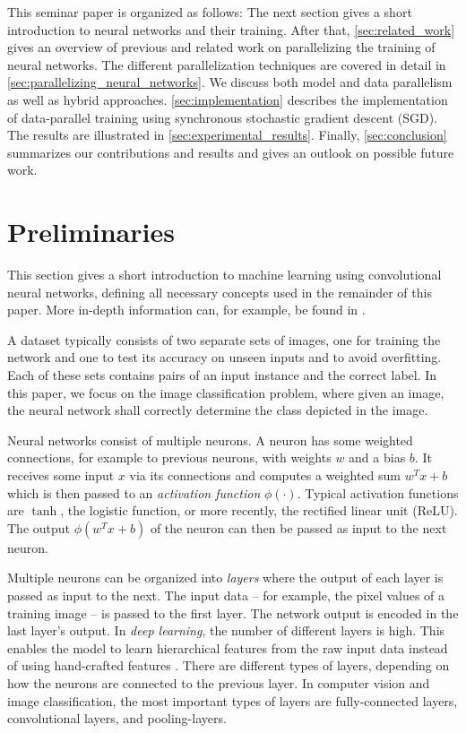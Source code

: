 \documentclass[conference,compsoc,a4paper]{IEEEtran}
\begin{document}
This seminar paper is organized as follows:
The next section gives a short introduction to neural networks and their training.
After that, \autoref{sec:related_work} gives an overview of previous and related work on parallelizing the training of neural networks.
The different parallelization techniques are covered in detail in \autoref{sec:parallelizing_neural_networks}.
We discuss both model and data parallelism as well as hybrid approaches.
\autoref{sec:implementation} describes the implementation of data-parallel training using synchronous stochastic gradient descent (SGD).
The results are illustrated in \autoref{sec:experimental_results}.
Finally, \autoref{sec:conclusion} summarizes our contributions and results and gives an outlook on possible future work.


\section{Preliminaries} %
\label{sec:preliminaries}
This section gives a short introduction to machine learning using convolutional neural networks, defining all necessary concepts used in the remainder of this paper.
More in-depth information can, for example, be found in \cite{goodfellow2016-DeepLearningBook}.

A dataset typically consists of two separate sets of images, one for training the network and one to test its accuracy on unseen inputs and to avoid overfitting.
Each of these sets contains pairs of an input instance and the correct label.
In this paper, we focus on the image classification problem, where given an image, the neural network shall correctly determine the class depicted in the image.

Neural networks consist of multiple neurons.
A neuron has some weighted connections, for example to previous neurons, with weights $w$ and a bias $b$.
It receives some input $x$ via its connections and computes a weighted sum $w^Tx+b$ which is then passed to an \emph{activation function} $\phi(\cdot)$.
Typical activation functions are $\tanh$, the logistic function, or more recently, the rectified linear unit (ReLU).
The output $\phi(w^Tx+b)$ of the neuron can then be passed as input to the next neuron.

Multiple neurons can be organized into \emph{layers} where the output of each layer is passed as input to the next.
The input data -- for example, the pixel values of a training image -- is passed to the first layer.
The network output is encoded in the last layer's output.
%
In \emph{deep learning}, the number of different layers is high.
This enables the model to learn hierarchical features from the raw input data instead of using hand-crafted features \cite{chilimbi2014-Project-Adam}.
%
There are different types of layers, depending on how the neurons are connected to the previous layer.
In computer vision and image classification, the most important types of layers are fully-connected layers, convolutional layers, and pooling-layers.
\end{document}
